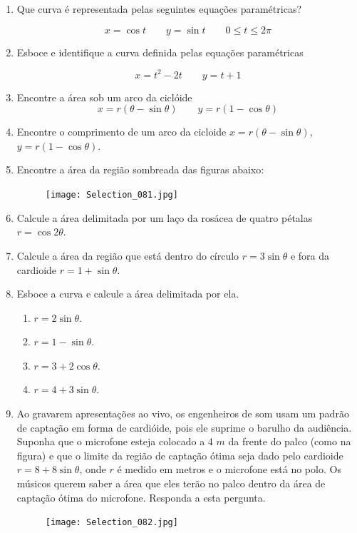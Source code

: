 \documentclass[11pt,a4paper]{article}
\begin{document}
\begin{enumerate}
	 \item Que curva é representada pelas seguintes equações paramétricas? 
	 
	 $$x = \cos t \quad \quad y = \sin t \quad \quad 0 \leq t \leq 2 \pi$$
	 
	 \item Esboce e identifique a curva definida pelas equações paramétricas
	 
	 $$x = t^2 - 2t \quad \quad y = t + 1$$
	 
	 \item Encontre a área sob um arco da ciclóide
	 $$x = r(\theta - \sin \theta) \quad \quad y = r(1 - \cos \theta)$$ 
	 
	 \item Encontre o comprimento de um arco da cicloide $x = r(\theta - \sin \theta)$, $y = r(1 - \cos \theta)$.
	 
	 \item Encontre a área da região sombreada das figuras abaixo:
	 
	 \begin{figure}[h]	
	\centering %
	\texttt{[image: Selection\_081.jpg]} 
	\end{figure}
	 
	\item Calcule a área delimitada por um laço da rosácea de quatro pétalas $r = \cos 2\theta$.
	
	\item Calcule a área da região que está dentro do círculo $r = 3 \sin \theta$ e fora da cardioide $r = 1 + \sin \theta$.
	
	\item Esboce a curva e calcule a área delimitada por ela.
	\begin{enumerate}
	\item $r = 2 \sin \theta$.
	\item $r = 1 - \sin \theta$.
	\item $r = 3 + 2 \cos \theta$.
	\item $r = 4 + 3 \sin \theta$.
	\end{enumerate}
	
	\item Ao gravarem apresentações ao vivo, os engenheiros de som usam um padrão de captação em forma de cardióide, pois ele suprime o barulho da audiência. Suponha que o microfone esteja colocado a 4 $m$ da frente do palco (como na figura) e que o limite da região de captação ótima seja dado pelo cardioide $r = 8 + 8 \sin \theta$, onde $r$ é medido em metros e o microfone está no polo. Os músicos querem saber a área que eles terão no palco dentro da área de captação ótima do microfone. Responda a esta pergunta. 	
	\begin{figure}[h]	
	\centering %
	\texttt{[image: Selection\_082.jpg]} 
	\end{figure}
\end{enumerate}		
	
\end{document}
